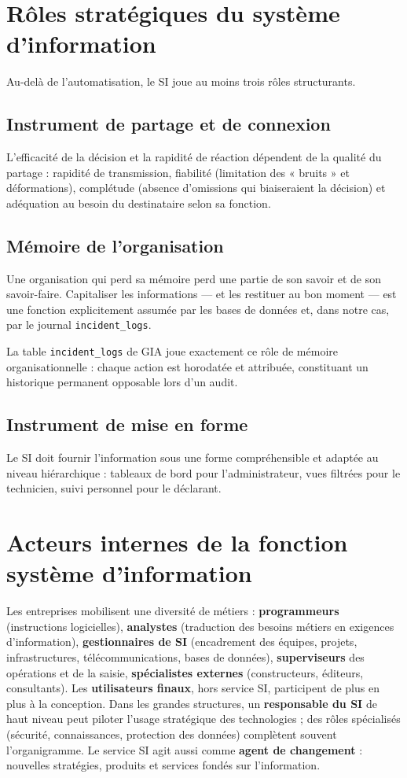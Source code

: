 \section{Rôles stratégiques du système d'information}
Au-delà de l'automatisation, le SI joue au moins trois rôles structurants.

\subsection{Instrument de partage et de connexion}
L'efficacité de la décision et la rapidité de réaction dépendent de la qualité du partage :
rapidité de transmission, fiabilité (limitation des « bruits » et déformations), complétude
(absence d'omissions qui biaiseraient la décision) et adéquation au besoin du destinataire selon
sa fonction.

\subsection{Mémoire de l'organisation}
Une organisation qui perd sa mémoire perd une partie de son savoir et de son savoir-faire.
Capitaliser les informations — et les restituer au bon moment — est une fonction explicitement
assumée par les bases de données et, dans notre cas, par le journal \texttt{incident\_logs}.

La table \texttt{incident\_logs} de GIA joue exactement ce rôle de mémoire organisationnelle :
chaque action est horodatée et attribuée, constituant un historique permanent opposable lors d'un
audit.

\subsection{Instrument de mise en forme}
Le SI doit fournir l'information sous une forme compréhensible et adaptée au niveau
hiérarchique : tableaux de bord pour l'administrateur, vues filtrées pour le technicien, suivi
personnel pour le déclarant.

\section{Acteurs internes de la fonction système d'information}
Les entreprises mobilisent une diversité de métiers : \textbf{programmeurs} (instructions
logicielles), \textbf{analystes} (traduction des besoins métiers en exigences d'information),
\textbf{gestionnaires de SI} (encadrement des équipes, projets, infrastructures,
télécommunications, bases de données), \textbf{superviseurs} des opérations et de la saisie,
\textbf{spécialistes externes} (constructeurs, éditeurs, consultants). Les \textbf{utilisateurs
finaux}, hors service SI, participent de plus en plus à la conception. Dans les grandes
structures, un \textbf{responsable du SI} de haut niveau peut piloter l'usage stratégique des
technologies ; des rôles spécialisés (sécurité, connaissances, protection des données) complètent
souvent l'organigramme. Le service SI agit aussi comme \textbf{agent de changement} : nouvelles
stratégies, produits et services fondés sur l'information.

